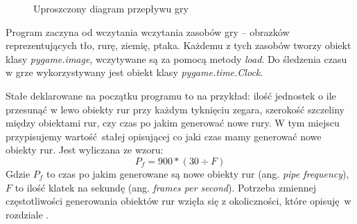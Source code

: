 \documentclass[a4paper, 12pt,oneside]{book}
\begin{document}
\begin{figure}
\begin{center}
\end{center}
\caption{Uproszczony diagram przepływu gry}
\label{game_flow_chart}
\end{figure}
\newpage{}
Program zaczyna od wczytania wczytania zasobów gry -- obrazków reprezentujących
tło, rurę, ziemię, ptaka. Każdemu z tych zasobów tworzy obiekt klasy
\textit{pygame.image}, wczytywane są za pomocą metody \textit{load}.
Do śledzenia czasu w grze wykorzystywany jest obiekt klasy
\textit{pygame.time.Clock}.

Stałe deklarowane na początku programu to na
przykład: ilość jednostek o ile przesunąć w lewo obiekty rur przy każdym
tyknięciu zegara, szerokość szczeliny między obiektami rur, czy czas po jakim
generować nowe rury. W tym miejscu przypisujemy wartość stałej opisującej co
jaki czas mamy generować nowe obiekty rur. Jest wyliczana ze wzoru:
\begin{equation}
	P_f = 900 * (30 \div F)
\end{equation}
Gdzie $P_f$ to czas po jakim generowane są nowe obiekty rur
(ang. \textit{pipe frequency}), $F$ to ilość klatek na sekundę
(ang. \textit{frames per second}). Potrzeba zmiennej częstotliwości
generowania obiektów rur wzięła się z okoliczności, które opisuję w rozdziale
.
\end{document}
